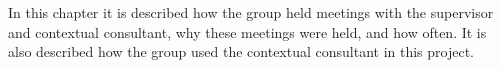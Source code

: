 In this chapter it is described how the group held meetings with the supervisor and contextual consultant, why these meetings were held, and how often. It is also described how the group used the contextual consultant in this project. 